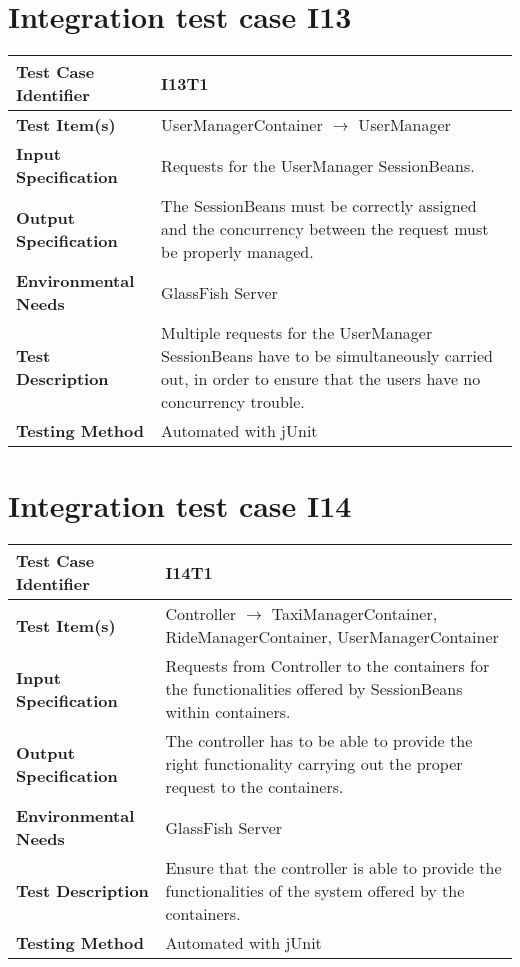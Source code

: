 \vspace{2em}

\section{Integration test case I13}

\begin{tabular}{l p{}}
    \hline
    \textbf{Test Case Identifier} & I13T1\\
    \hline
    \textbf{Test Item(s)} & UserManagerContainer $\rightarrow$ UserManager \\
    \hline
    \textbf{Input Specification} & Requests for the UserManager SessionBeans.\\
    \hline
    \textbf{Output Specification} & The SessionBeans must be correctly assigned and  the concurrency between the request must be properly managed.\\
    \hline
    \textbf{Environmental Needs} & GlassFish Server\\
    \hline
    \textbf{Test Description} & Multiple requests for the UserManager SessionBeans have to be simultaneously carried out, in order to ensure that the users have no concurrency trouble.\\
    \hline
    \textbf{Testing Method} & Automated with jUnit \\
    \hline
\end{tabular}

\vspace{2em}

\section{Integration test case I14}

\begin{tabular}{l p{}}
    \hline
    \textbf{Test Case Identifier} & I14T1\\
    \hline
    \textbf{Test Item(s)} & Controller $\rightarrow$ TaxiManagerContainer, RideManagerContainer, UserManagerContainer \\
    \hline
    \textbf{Input Specification} & Requests from Controller to the containers for the functionalities offered by SessionBeans within containers.\\
    \hline
    \textbf{Output Specification} & The controller has to be able to provide the right functionality carrying out the proper request to the containers.\\
    \hline
    \textbf{Environmental Needs} & GlassFish Server\\
    \hline
    \textbf{Test Description} & Ensure that the controller is able to provide the functionalities of the system offered by the containers.\\
    \hline
    \textbf{Testing Method} & Automated with jUnit \\
    \hline
\end{tabular}


